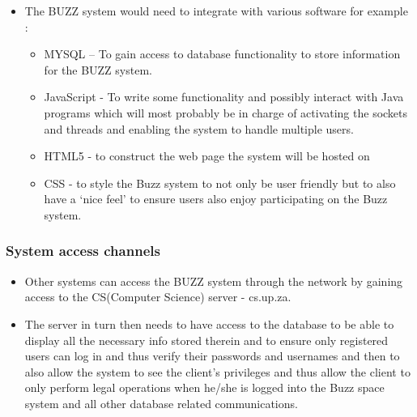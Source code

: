 \documentclass[a4paper]{article}
\begin{document}
\begin{itemize}
\item The BUZZ system would need to integrate with various software for example :
\begin{itemize}
\item  MYSQL – To gain access to database functionality to store information for the BUZZ system.
\item JavaScript - To write some functionality and possibly interact with Java programs which will most probably be in charge of activating the sockets and threads and enabling the system to handle multiple users.
\item HTML5 - to construct the web page the system will be hosted on 
\item CSS - to style the Buzz system to not only be user friendly but to also have a ‘nice feel’ to ensure users also enjoy participating on the Buzz system.
\end{itemize}
\end{itemize}

\subsubsection{System access channels }

\begin{itemize}
\item Other systems can access the BUZZ system through the network by gaining access to the  CS(Computer Science) server - cs.up.za. 
\item The server in turn then needs to have access to the database to be able to display all the necessary info stored therein and to ensure only registered users can log in and thus verify their passwords and usernames and then to also allow the system to see the client's privileges and thus allow the client to only perform legal operations when he/she is logged into the Buzz space system and all other database related communications. 
\end{itemize}
\end{document}
